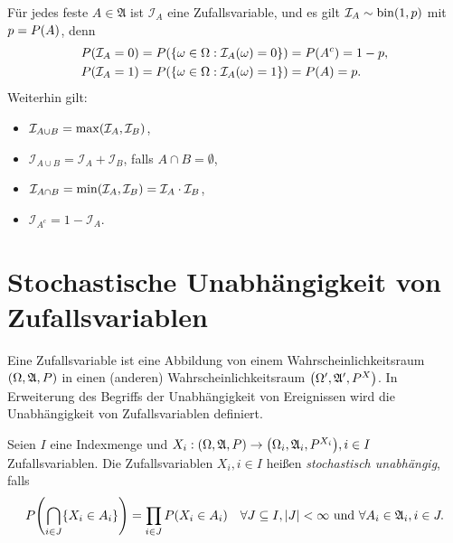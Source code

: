 \documentclass{lecture}
\begin{document}
    \begin{remark}
        Für jedes feste \(A \in \mathfrak{A}\) ist \(\mathcal{I}_A\) eine Zufallsvariable, und es gilt \(\mathcal{I}_A \sim \bin\parentheses*{1, p}\) mit \(p = P\parentheses*{A}\), denn
        \begin{align*}
            P\parentheses*{\mathcal{I}_A = 0} &= P\parentheses*{\braces*{\omega \in \Omega : \mathcal{I}_A\parentheses*{\omega} = 0}} = P\parentheses*{A^c} = 1 - p,\\
            P\parentheses*{\mathcal{I}_A = 1} &= P\parentheses*{\braces*{\omega \in \Omega : \mathcal{I}_A\parentheses*{\omega} = 1}} = P\parentheses*{A} = p.
        \end{align*}
        Weiterhin gilt:
        \begin{itemize}
            \item \(\mathcal{I}_{A \cup B} = \max\parentheses*{\mathcal{I}_A, \mathcal{I}_B}\),
            \item \(\mathcal{I}_{A \cup B} = \mathcal{I}_A + \mathcal{I}_B\), falls \(A \cap B = \emptyset\),
            \item \(\mathcal{I}_{A \cap B} = \min\parentheses*{\mathcal{I}_A, \mathcal{I}_B} = \mathcal{I}_A \cdot \mathcal{I}_B\),
            \item \(\mathcal{I}_{A^c} = 1 - \mathcal{I}_A\).
        \end{itemize}
    \end{remark}


    \section*{Stochastische Unabhängigkeit von Zufallsvariablen}

    Eine Zufallsvariable ist eine Abbildung von einem Wahrscheinlichkeitsraum \(\parentheses*{\Omega, \mathfrak{A}, P}\) in einen (anderen) Wahrscheinlichkeitsraum \(\parentheses*{\Omega', \mathfrak{A}', P^X}\).
    In Erweiterung des Begriffs der Unabhängigkeit von Ereignissen wird die Unabhängigkeit von Zufallsvariablen definiert.

    \begin{definition}
        Seien \(I\) eine Indexmenge und \(X_i: \parentheses*{\Omega, \mathfrak{A}, P} \to \parentheses*{\Omega_i, \mathfrak{A}_i, P^{X_i}}, i \in I\) Zufallsvariablen.
        Die Zufallsvariablen \(X_i, i \in I\) heißen \emph{stochastisch unabhängig}, falls
        \[
            P\parentheses*{\bigcap_{i \in J}\braces*{X_i \in A_i}} = \prod_{i \in J}P\parentheses*{X_i \in A_i} \quad \forall J \subseteq I, \absolute*{J} < \infty\text{ und }\forall A_i \in \mathfrak{A}_i, i \in J.
        \]
    \end{definition}
\end{document}
